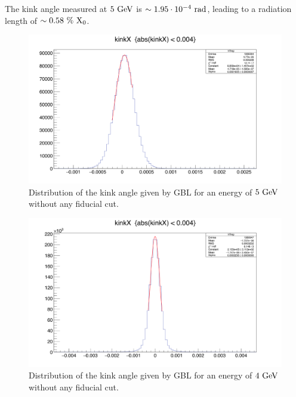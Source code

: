    The kink angle measured at $5~\rm{GeV}$ is $\sim 1.95 \cdot 10^{-4}~\rm{rad}$, leading to a radiation length of $\sim 0.58~\%~\rm{X_0}$.
   
   \begin{figure}[!h]
     \centering
     \includegraphics[width = \textwidth]{Pictures/X0/kinkAngle5GeV_2.png}
     \caption{Distribution of the kink angle given by GBL for an energy of $5~\rm{GeV}$ without any fiducial cut.}
     \label{fig:kinkAngle5GeV}
   \end{figure} 

   \begin{figure}[!p]
     \centering
     \includegraphics[width = \textwidth]{Pictures/X0/kinkAngle4GeV.png}
     \caption{Distribution of the kink angle given by GBL for an energy of $4~\rm{GeV}$ without any fiducial cut.}
     \label{fig:kinkAngle4GeV}
   \end{figure} 

